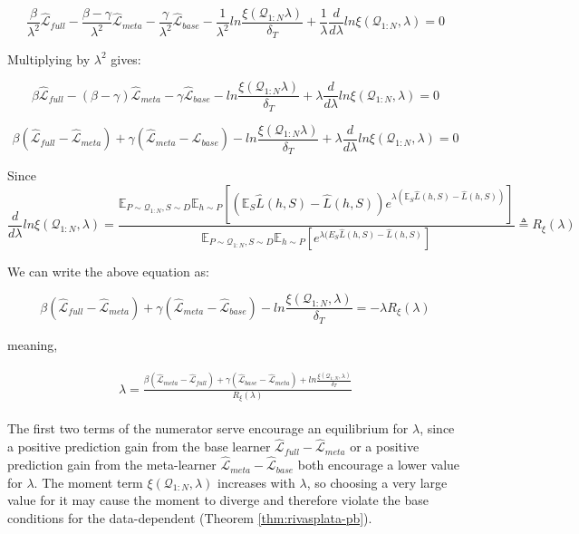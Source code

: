 \documentclass{article}
\theoremstyle{definition}
\newcommand{\Expect}[2]{\mathbb{E}_{#1}\left [#2 \right ]}
\begin{document}
$$\frac{\beta}{\lambda^2} \hat{\mathcal{L}}_{full}-\frac{\beta-\gamma}{\lambda^2}\hat{\mathcal{L}}_{meta}-\frac{\gamma}{\lambda^2}\hat{\mathcal{L}}_{base}-\frac{1}{\lambda^2}ln\frac{\xi(\mathcal{Q}_{1:N}\lambda)}{\delta_T}+\frac{1}{\lambda}\frac{d}{d\lambda}ln\xi(\mathcal{Q}_{1:N},\lambda)=0$$

Multiplying by $\lambda^2$ gives:

$$\beta \hat{\mathcal{L}}_{full}-(\beta-\gamma)\hat{\mathcal{L}}_{meta}-\gamma\hat{\mathcal{L}}_{base}-ln\frac{\xi(\mathcal{Q}_{1:N}\lambda)}{\delta_T}+\lambda\frac{d}{d\lambda}ln\xi(\mathcal{Q}_{1:N},\lambda)=0$$

$$\beta(\hat{\mathcal{L}}_{full}-\hat{\mathcal{L}}_{meta})+\gamma(\hat{\mathcal{L}}_{meta}-\hat{\mathcal{L}}_{base})-ln\frac{\xi(\mathcal{Q}_{1:N}\lambda)}{\delta_T}+\lambda\frac{d}{d\lambda}ln\xi(\mathcal{Q}_{1:N},\lambda)=0$$

Since 
$$\frac{d}{d\lambda}ln\xi(\mathcal{Q}_{1:N},\lambda)=\frac{\mathbb{E}_{P\sim \mathcal{Q}_{1:N},S\sim D}\Expect{h\sim P}{(\mathbb{E}_S\hat{L}(h, S)-\hat{L}(h, S))e^{\lambda(\mathbb{E}_S\hat{L}(h, S)-\hat{L}(h, S))} }}{\mathbb{E}_{P\sim \mathcal{Q}_{1:N},S\sim D}\Expect{h\sim P}{e^{\lambda(E_S\hat{L}(h, S)-\hat{L}(h, S)} }}\triangleq R_\xi(\lambda)$$

We can write the above equation as:

$$\beta(\hat{\mathcal{L}}_{full}-\hat{\mathcal{L}}_{meta})+\gamma(\hat{\mathcal{L}}_{meta}-\hat{\mathcal{L}}_{base})-ln\frac{\xi(\mathcal{Q}_{1:N},\lambda)}{\delta_T}=-\lambda R_\xi(\lambda)$$

meaning,

\begin{align} \label{eq:meta-pb-lambda}
\begin{split}
\lambda = \frac{\beta(\hat{\mathcal{L}}_{meta}-\hat{\mathcal{L}}_{full})+\gamma(\hat{\mathcal{L}}_{base}-\hat{\mathcal{L}}_{meta})+ln\frac{\xi(\mathcal{Q}_{1:N},\lambda)}{\delta_T}}{R_\xi(\lambda)}
\end{split}
\end{align}

The first two terms of the numerator serve encourage an equilibrium for $\lambda$, since a positive prediction gain from the base learner $\hat{\mathcal{L}}_{full}-\hat{\mathcal{L}}_{meta}$ or a positive prediction gain from the meta-learner $\hat{\mathcal{L}}_{meta}-\hat{\mathcal{L}}_{base}$ both encourage a lower value for $\lambda$. The moment term $\xi(\mathcal{Q}_{1:N}, \lambda)$ increases with $\lambda$, so choosing a very large value for it may cause the moment to diverge and therefore violate the base conditions for the data-dependent (Theorem \ref{thm:rivasplata-pb}).
\end{document}
